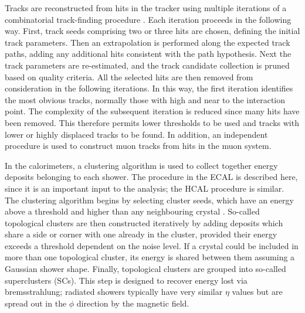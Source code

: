 Tracks are reconstructed from hits in the tracker using multiple iterations of a combinatorial track-finding procedure \cite{TrackReco}.
Each iteration proceeds in the following way.
First, track seeds comprising two or three hits are chosen, defining the initial track parameters.
Then an extrapolation is performed along the expected track paths, adding any additional hits consistent with the path hypothesis.
Next the track parameters are re-estimated, and the track candidate collection is pruned based on quality criteria.
All the selected hits are then removed from consideration in the following iterations.
In this way, the first iteration identifies the most obvious tracks, normally those with high \pt and near to the interaction point.
The complexity of the subsequent iteration is reduced since many hits have been removed.
This therefore permits lower thresholds to be used and tracks with lower \pt or highly displaced tracks to be found.
In addition, an independent procedure is used to construct muon tracks from hits in the muon system.

In the calorimeters, a clustering algorithm is used to collect together energy deposits belonging to each shower. %
The procedure in the ECAL is described here, since it is an important input to the \Hgg analysis; the HCAL procedure is similar.
The clustering algorithm begins by selecting cluster seeds, which have an energy above a threshold and higher than any neighbouring crystal \cite{PhotonReco}.
So-called topological clusters are then constructed iteratively by adding deposits which share a side or corner with one already in the cluster, 
provided their energy exceeds a threshold dependent on the noise level. %
If a crystal could be included in more than one topological cluster, its energy is shared between them assuming a Gaussian shower shape.
Finally, topological clusters are grouped into so-called superclusters (SCs).
This step is designed to recover energy lost via bremsstrahlung; 
radiated showers typically have very similar $\eta$ values 
but are spread out in the $\phi$ direction by the magnetic field.

\newpage

